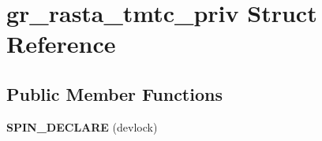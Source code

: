 \hypertarget{structgr__rasta__tmtc__priv}{}\section{gr\+\_\+rasta\+\_\+tmtc\+\_\+priv Struct Reference}
\label{structgr__rasta__tmtc__priv}
\subsection*{Public Member Functions}
\begin{DoxyCompactItemize}
\item 
\mbox{\label{structgr__rasta__tmtc__priv_a6d56ec47fee08c24861239b5123ca0d9}} 
{\bfseries S\+P\+I\+N\+\_\+\+D\+E\+C\+L\+A\+RE} (devlock)
\end{DoxyCompactItemize}
